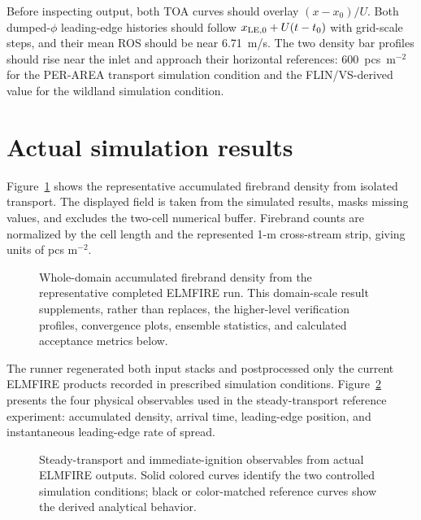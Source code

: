 Before inspecting output, both TOA curves should overlay $(x-x_0)/U$. Both
dumped-$\phi$ leading-edge histories should follow
$x_{\rm LE,0}+U(t-t_0)$ with grid-scale steps, and their
mean ROS should be near 6.71~m/s. The two density bar profiles should rise near
the inlet and approach their horizontal references: 600~pcs~m$^{-2}$ for the
PER-AREA transport simulation condition and the FLIN/VS-derived value for the wildland simulation condition.
\section{Actual simulation results}

Figure~\ref{fig:domain-result} shows the representative accumulated firebrand density from isolated transport.
The displayed field is taken from the simulated results, masks missing values, and excludes
the two-cell numerical buffer.  Firebrand counts are normalized by the cell length and the represented 1-m cross-stream strip, giving units of pcs m$^{-2}$.

\begin{figure}[H]
\centering
{}
\caption{Whole-domain accumulated firebrand density from the representative completed ELMFIRE run.  This
domain-scale result supplements, rather than replaces, the higher-level verification
profiles, convergence plots, ensemble statistics, and calculated acceptance metrics below.}
\label{fig:domain-result}
\end{figure}

The runner regenerated both input stacks and postprocessed only the current
ELMFIRE products recorded in prescribed simulation conditions.
Figure~\ref{fig:steady-reference} presents the four physical observables
used in the steady-transport reference experiment: accumulated density, arrival
time, leading-edge position, and instantaneous leading-edge rate of spread.

\begin{figure}[H]
\centering
{}
\caption{Steady-transport and immediate-ignition observables from actual
ELMFIRE outputs. Solid colored curves identify the two controlled simulation conditions;
black or color-matched reference curves show the derived analytical behavior.}
\label{fig:steady-reference}
\end{figure}

